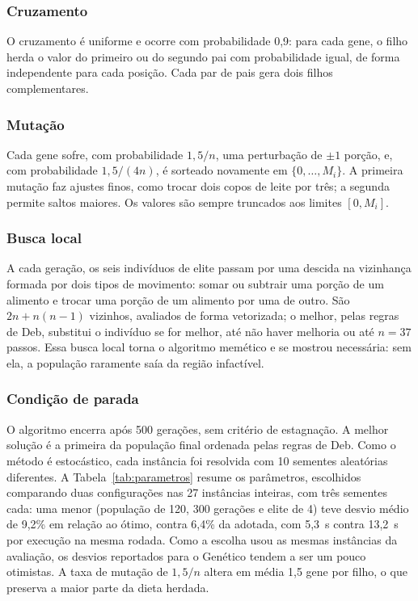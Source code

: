 \documentclass[12pt]{article}
\begin{document}
\subsubsection{Cruzamento}

O cruzamento é uniforme e ocorre com probabilidade 0,9: para cada gene, o filho herda o
valor do primeiro ou do segundo pai com probabilidade igual, de forma independente para
cada posição. Cada par de pais gera dois filhos complementares.

\subsubsection{Mutação}

Cada gene sofre, com probabilidade $1{,}5/n$, uma perturbação de $\pm 1$ porção, e,
com probabilidade $1{,}5/(4n)$, é sorteado novamente em $\{0, \dots, M_i\}$. A primeira
mutação faz ajustes finos, como trocar dois copos de leite por três; a segunda permite
saltos maiores. Os valores são sempre truncados aos limites $[0, M_i]$.

\subsubsection{Busca local}

A cada geração, os seis indivíduos de elite passam por uma descida na vizinhança
formada por dois tipos de movimento: somar ou subtrair uma porção de um alimento e
trocar uma porção de um alimento por uma de outro. São $2n + n(n-1)$ vizinhos, avaliados de forma
vetorizada; o melhor, pelas regras de Deb, substitui o indivíduo se for melhor, até não
haver melhoria ou até $n = 37$ passos. Essa busca local torna o algoritmo memético e se
mostrou necessária: sem ela, a população raramente saía da região infactível.

\subsubsection{Condição de parada}

O algoritmo encerra após 500 gerações, sem critério de estagnação. A melhor solução
é a primeira da população final ordenada pelas regras de Deb. Como o método é
estocástico, cada instância foi resolvida com 10 sementes aleatórias diferentes. A
Tabela~\ref{tab:parametros} resume os parâmetros, escolhidos comparando duas configurações nas 27 instâncias inteiras, com três
sementes cada: uma menor (população de 120, 300 gerações e elite de 4) teve desvio médio
de 9{,}2\% em relação ao ótimo, contra 6{,}4\% da adotada, com
5{,}3~s contra 13{,}2~s por execução na mesma rodada. Como a
escolha usou as mesmas instâncias da avaliação, os desvios reportados para o Genético
tendem a ser um pouco otimistas. A taxa de mutação de $1{,}5/n$ altera em média 1,5 gene por
filho, o que
preserva a maior parte da dieta herdada.
\end{document}
